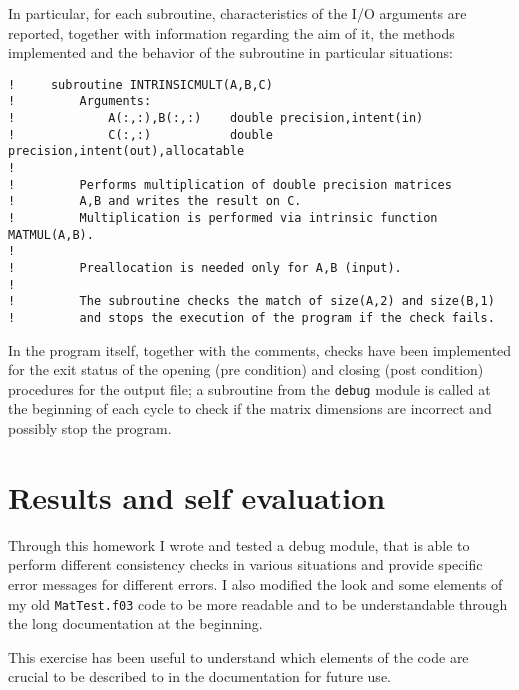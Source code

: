 \documentclass[a4paper]{article}
\begin{document}
In particular, for each subroutine, characteristics of the I/O arguments are reported, together with information regarding the aim of it, the methods implemented and the behavior of the subroutine in particular situations:
\begin{verbatim}
!     subroutine INTRINSICMULT(A,B,C)
!         Arguments:
!             A(:,:),B(:,:)    double precision,intent(in)
!             C(:,:)           double precision,intent(out),allocatable
! 
!         Performs multiplication of double precision matrices
!         A,B and writes the result on C.
!         Multiplication is performed via intrinsic function MATMUL(A,B).
! 
!         Preallocation is needed only for A,B (input).
! 
!         The subroutine checks the match of size(A,2) and size(B,1)
!         and stops the execution of the program if the check fails.
\end{verbatim}

\noindent In the program itself, together with the comments, checks have been implemented for the exit status of the opening (pre condition) and closing (post condition) procedures for the output file; a subroutine from the \lstinline{debug} module is called at the beginning of each cycle to check if the matrix dimensions are incorrect and possibly stop the program.


\section*{Results and self evaluation}
Through this homework I wrote and tested a debug module, that is able to perform different consistency checks in various situations and provide specific error messages for different errors.
I also modified the look and some elements of my old \lstinline{MatTest.f03} code to be more readable and to be understandable through the long documentation at the beginning.

\noindent This exercise has been useful to understand which elements of the code are crucial to be described to in the documentation for future use.
\end{document}
